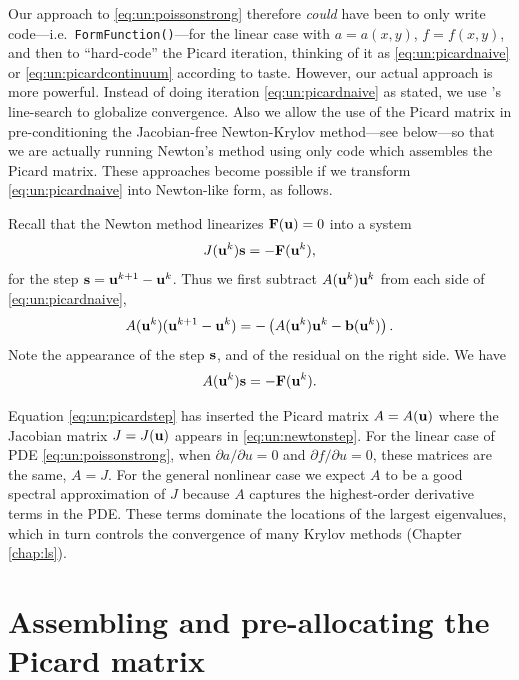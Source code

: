 Our approach to \eqref{eq:un:poissonstrong} therefore \emph{could} have been to only write code---i.e.~\texttt{FormFunction()}---for the linear case with $a=a(x,y)$, $f=f(x,y)$, and then to ``hard-code'' the Picard iteration, thinking of it as \eqref{eq:un:picardnaive} or \eqref{eq:un:picardcontinuum} according to taste.  However, our actual approach is more powerful.  Instead of doing iteration \eqref{eq:un:picardnaive} as stated, we use \pSNES's line-search to globalize convergence.  Also we allow the use of the Picard matrix in pre-conditioning the Jacobian-free Newton-Krylov method---see below---so that we are actually running Newton's method using only code which assembles the Picard matrix.  These approaches become possible if we transform \eqref{eq:un:picardnaive} into Newton-like form, as follows.

Recall that the Newton method linearizes $\mathbf{F}(\mathbf{u})=0$ into a system
\begin{equation}
J(\mathbf{u}^k) \mathbf{s} = -\mathbf{F}(\mathbf{u}^k),  \label{eq:un:newtonstep}
\end{equation}
for the step $\mathbf{s} = \mathbf{u}^{k+1}-\mathbf{u}^k$.  Thus we first subtract $A(\mathbf{u}^k) \mathbf{u}^k$ from each side of \eqref{eq:un:picardnaive},
\begin{equation*}
A(\mathbf{u}^k) (\mathbf{u}^{k+1}-\mathbf{u}^k) = - \left(A(\mathbf{u}^k) \mathbf{u}^k - \mathbf{b}(\mathbf{u}^k)\right).
\end{equation*}
Note the appearance of the step $\mathbf{s}$, and of the residual on the right side.  We have
\begin{equation}
A(\mathbf{u}^k) \mathbf{s} = -\mathbf{F}(\mathbf{u}^k).  \label{eq:un:picardstep}
\end{equation}

Equation \eqref{eq:un:picardstep} has inserted the Picard matrix $A=A(\mathbf{u})$ where the Jacobian matrix $J=J(\mathbf{u})$ appears in \eqref{eq:un:newtonstep}.  For the linear case of PDE \eqref{eq:un:poissonstrong}, when $\partial a/\partial u=0$ and $\partial f/\partial u=0$, these matrices are the same, $A=J$.  For the general nonlinear case we expect $A$ to be a good spectral approximation of $J$ because $A$ captures the highest-order derivative terms in the PDE.  These terms  dominate the locations of the largest eigenvalues, which in turn controls the convergence of many Krylov methods (Chapter \ref{chap:ls}).


\section{Assembling and pre-allocating the Picard matrix}

